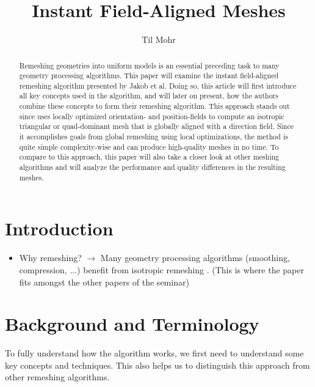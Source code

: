 \documentclass{ACGSeminar}
\begin{document}
\title{Instant Field-Aligned Meshes}

\author{Til Mohr}


\maketitle


\begin{abstract}
Remeshing geometries into uniform models is an essential preceding task to many geometry processing algorithms. This paper will examine the instant field-aligned remeshing algorithm presented by Jakob et al. Doing so, this article will first introduce all key concepts used in the algorithm, and will later on present,
how the authors combine these concepts to form their remeshing algorithm. This approach stands out since uses locally optimized orientation- and position-fields to compute an isotropic triangular or quad-dominant mesh that is globally aligned with a direction field. Since it accomplishes goals from global remeshing using local optimizations, the method is quite simple complexity-wise and can produce high-quality meshes in no time. To compare to this approach, this paper will also take a closer look at other meshing algorithms and will analyze the performance and quality differences in the resulting meshes.
\end{abstract}

\tableofcontents

\newpage

\label{cha:introduction}
\section{Introduction}
\begin{itemize}
	\item	Why remeshing? $\rightarrow$ Many geometry processing algorithms (smoothing, compression, ...) benefit from isotropic remeshing \cite{surazhsky2003isotropic}. (This is where the paper fits amongst the other papers of the seminar)
\end{itemize}

\section{Background and Terminology}
To fully understand how the algorithm works, we first need to understand some key concepts and techniques. This also helps us to distinguish this approach from other remeshing algorithms.
\end{document}
